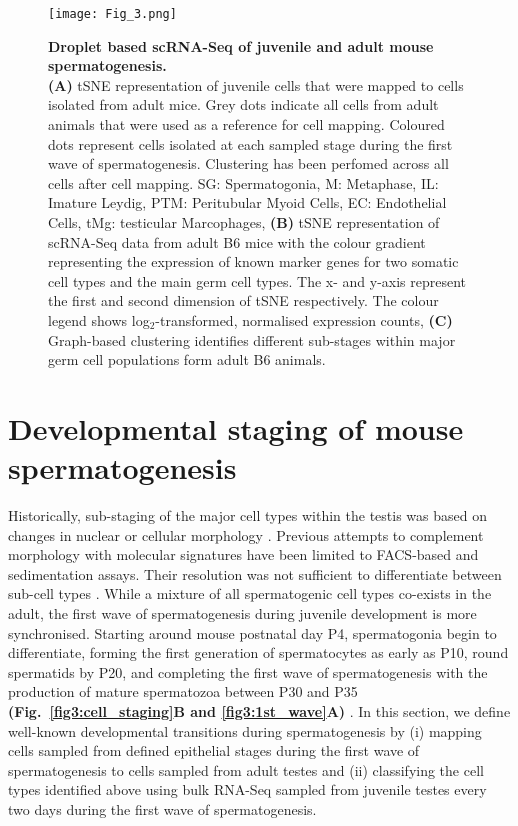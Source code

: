 \newpage

\begin{figure}[!h]
\centering
\texttt{[image: Fig\_3.png]}
\caption[Droplet based scRNA-Seq of juvenile and adult mouse spermatogenesis]{\textbf{Droplet based scRNA-Seq of juvenile and adult mouse spermatogenesis.}\\
\textbf{(A)} tSNE representation of juvenile cells that were mapped to cells isolated from adult mice. Grey dots indicate all cells from adult animals that were used as a reference for cell mapping. Coloured dots represent cells isolated at each sampled stage during the first wave of spermatogenesis. Clustering has been perfomed across all cells after cell mapping. SG: Spermatogonia, M: Metaphase, IL: Imature Leydig, PTM: Peritubular Myoid Cells, EC: Endothelial Cells, tMg: testicular Marcophages, \textbf{(B)} tSNE representation of scRNA-Seq data from adult B6 mice with the colour gradient representing the expression of known marker genes for two somatic cell types and the main germ cell types. The x- and y-axis represent the first and second dimension of tSNE respectively. The colour legend shows log$_2$-transformed, normalised expression counts, \textbf{(C)} Graph-based clustering identifies different sub-stages within major germ cell populations form adult B6 animals. 
}
\label{fig3:cell_types}
\end{figure}

\newpage

\section{Developmental staging of mouse spermatogenesis}

Historically, sub-staging of the major cell types within the testis was based on changes in nuclear or cellular morphology \citep{Oakberg1956,  Oakberg1956a}. Previous attempts to complement morphology with molecular signatures have been limited to FACS-based and sedimentation assays. Their resolution was not sufficient to differentiate between sub-cell types \citep{Bastos2005, Gaysinskaya2014, Lam1970, Meistrich1977, Romrell1976, Soumillon2013}. While a mixture of all spermatogenic cell types co-exists in the adult, the first wave of spermatogenesis during juvenile development is more synchronised. Starting around mouse postnatal day P4, spermatogonia begin to differentiate, forming the first generation of spermatocytes as early as P10, round spermatids by P20, and completing the first wave of spermatogenesis with the production of mature spermatozoa between P30 and P35 \textbf{(Fig.~\ref{fig3:cell_staging}B and \ref{fig3:1st_wave}A)} \citep{Bellve1977, Janca1986, Nebel1961}. In this section, we define well-known developmental transitions during spermatogenesis by (i) mapping cells sampled from defined epithelial stages during the first wave of spermatogenesis to cells sampled from adult testes and (ii) classifying the cell types identified above using bulk RNA-Seq sampled from juvenile testes every two days during the first wave of spermatogenesis. 

